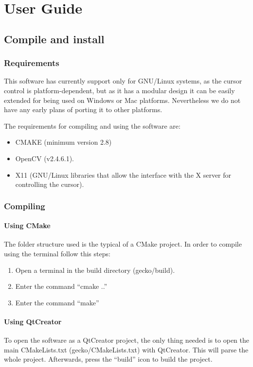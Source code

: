 \section{User Guide}
\subsection{Compile and install }
\subsubsection{Requirements }
This software has currently support only for GNU/Linux systems, as the cursor control is platform-dependent, but as it has a modular design it can be easily extended for being used on Windows or Mac platforms. Nevertheless we do not have any early plans of porting it to other platforms. 

The requirements for compiling and using the software are:
\begin{itemize}
\item CMAKE (minimum version 2.8)
\item OpenCV (v2.4.6.1).
\item X11 (GNU/Linux libraries that allow the interface with the X server for controlling the cursor). 
\end{itemize}


\subsubsection{Compiling}
\paragraph{Using CMake }
The folder structure used is the typical of a CMake project. In order to compile using the terminal follow this steps: 
\begin{enumerate}
 \item Open a terminal in the build directory (gecko/build). 
 \item Enter the command ``cmake ..''
 \item Enter the command ``make''
\end{enumerate}

\paragraph{Using QtCreator}
To open the software as a QtCreator project, the only thing needed is to open the main CMakeLists.txt (gecko/CMakeLists.txt) with QtCreator. This will parse the whole project. 
Afterwards, press the ``build'' icon to build the project. 


